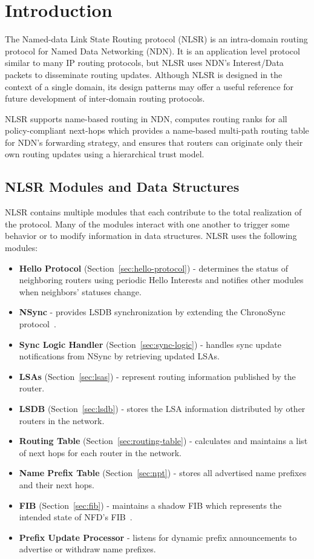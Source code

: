 \section{Introduction}
\label{sec:intro}

The Named-data Link State Routing protocol (NLSR) is an intra-domain routing protocol for Named Data Networking (NDN).
It is an application level protocol similar to many IP routing protocols, but NLSR uses NDN's Interest/Data packets to disseminate routing updates.
Although NLSR is designed in the context of a single domain, its design patterns may offer a useful reference for future development of inter-domain routing protocols.

NLSR supports name-based routing in NDN, computes routing ranks for all policy-compliant next-hops which provides a name-based multi-path routing table for NDN's forwarding strategy,
and ensures that routers can originate only their own routing updates using a hierarchical trust model.

\subsection{NLSR Modules and Data Structures}
\label{sec:modules}
NLSR contains multiple modules that each contribute to the total realization of the protocol.
Many of the modules interact with one another to trigger some behavior or to modify information in data structures.
NLSR uses the following modules:
\begin{itemize}
\item \textbf{Hello Protocol} (Section~\ref{sec:hello-protocol}) - determines the status of neighboring routers using periodic Hello Interests and notifies other modules when neighbors' statuses change.
\item \textbf{NSync} - provides LSDB synchronization by extending the ChronoSync protocol~\cite{chronosync}.
\item \textbf{Sync Logic Handler} (Section~\ref{sec:sync-logic}) - handles sync update notifications from NSync by retrieving updated LSAs.
\item \textbf{LSAs} (Section~\ref{sec:lsas}) - represent routing information published by the router.
\item \textbf{LSDB} (Section~\ref{sec:lsdb}) - stores the LSA information distributed by other routers in the network.
\item \textbf{Routing Table} (Section~\ref{sec:routing-table}) - calculates and maintains a list of next hops for each router in the network.
\item \textbf{Name Prefix Table} (Section~\ref{sec:npt}) - stores all advertised name prefixes and their next hops.
\item \textbf{FIB} (Section~\ref{sec:fib}) - maintains a shadow FIB which represents the intended state of NFD's FIB~\cite{NFD}.
\item \textbf{Prefix Update Processor} - listens for dynamic prefix announcements to advertise or withdraw name prefixes.
\end{itemize}

